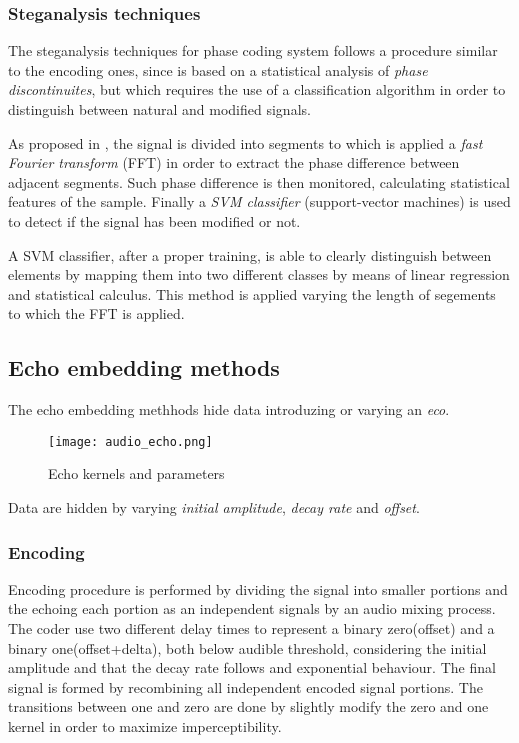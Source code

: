 \documentclass[../../main.tex]{subfiles}
\begin{document}
\subsubsection{Steganalysis techniques}
The steganalysis techniques for phase coding system follows a
procedure similar to the encoding ones, since is based on a statistical
analysis of \emph{phase discontinuites}, but which requires the use of a
classification algorithm in order to distinguish between natural and
modified signals.

As proposed in \cite{steganalysis-phase-coding}, the signal is divided into segments to which is applied a
\emph{fast Fourier transform} (FFT) in order to extract the phase difference between adjacent segments.
Such phase difference is then monitored, calculating statistical features of the sample. Finally a \emph{SVM classifier} (support-vector machines) is used to
detect if the signal has been modified or not.

A SVM classifier, after a proper training, is able to clearly distinguish
between elements by mapping them into two different classes by means of
linear regression and statistical calculus.
This method is applied varying the length of segements to which the FFT is
applied.

\subsection{Echo embedding methods}
The echo embedding methhods hide data introduzing or varying an \emph{eco}.
\begin{figure}[h]
    \centering
    \caption{Echo kernels and parameters}
    \texttt{[image: audio\_echo.png]}
\end{figure}
Data are hidden by varying \emph{initial amplitude}, \emph{decay rate} and
\emph{offset}.
\subsubsection{Encoding}
Encoding procedure is performed by dividing the signal into smaller
portions and the echoing each portion as an independent signals by an audio
mixing process.
The coder use two different delay times to represent a binary zero(offset)
and a binary one(offset+delta), both below audible threshold, considering
the initial amplitude and that the decay rate follows and exponential
behaviour.
The final signal is formed by recombining all independent encoded signal
portions.
The transitions between one and zero are done by slightly modify the zero
and one kernel in order to maximize imperceptibility.
\end{document}
